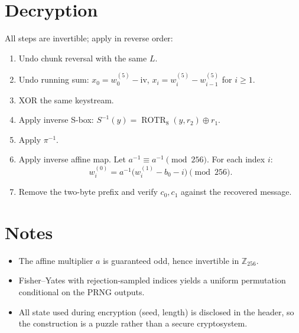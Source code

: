 \documentclass[11pt]{article}
\begin{document}
\section*{Decryption}
All steps are invertible; apply in reverse order:
\begin{enumerate}
  \item Undo chunk reversal with the same \(L\).
  \item Undo running sum: \(x_0 = w^{(5)}_0 - \text{iv}\), \(x_i = w^{(5)}_i - w^{(5)}_{i-1}\) for \(i\ge 1\).
  \item XOR the same keystream.
  \item Apply inverse S-box: \(S^{-1}(y) = \operatorname{ROTR}_8(y, r_2) \oplus r_1\).
  \item Apply \(\pi^{-1}\).
  \item Apply inverse affine map. Let \(a^{-1} \equiv a^{-1} \pmod{256}\). For each index \(i\):
  \[
   w^{(0)}_i = a^{-1}\big(w^{(1)}_i - b_0 - i\big) \pmod{256}.
  \]
  \item Remove the two-byte prefix and verify \(c_0, c_1\) against the recovered message.
\end{enumerate}

\section*{Notes}
\begin{itemize}
  \item The affine multiplier \(a\) is guaranteed odd, hence invertible in \(\mathbb{Z}_{256}\).
  \item Fisher--Yates with rejection-sampled indices yields a uniform permutation conditional on the PRNG outputs.
  \item All state used during encryption (seed, length) is disclosed in the header, so the construction is a puzzle rather than a secure cryptosystem.
\end{itemize}
\end{document}
